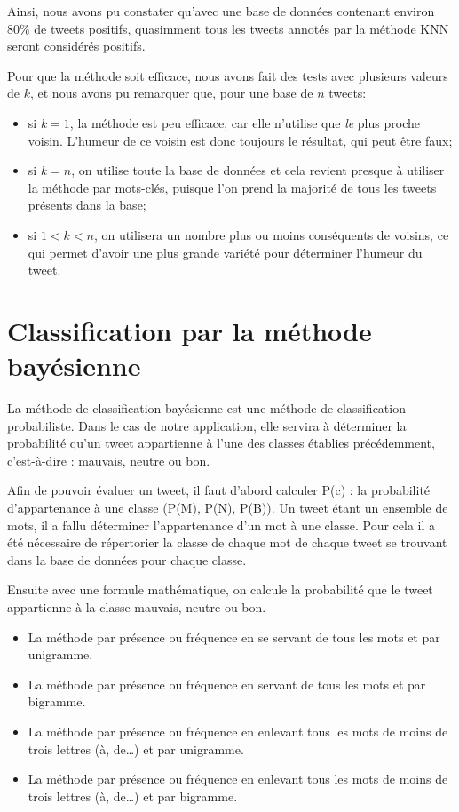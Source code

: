 \documentclass[12pt,a4paper]{report}
\begin{document}
Ainsi, nous avons pu constater qu'avec une base de données contenant environ
80\% de tweets positifs, quasimment tous les tweets annotés par la méthode KNN
seront considérés positifs.

Pour que la méthode soit efficace, nous avons fait des tests avec plusieurs
valeurs de $k$, et nous avons pu remarquer que, pour une base de $n$ tweets:

\begin{itemize}
	\item si $k=1$, la méthode est peu efficace, car elle n'utilise que
		\textit{le} plus proche voisin. L'humeur de ce voisin est donc
		toujours le résultat, qui peut être faux;
	\item si $k=n$, on utilise toute la base de données et cela revient presque
		à utiliser la méthode par mots-clés, puisque l'on prend la majorité de
		tous les tweets présents dans la base;
	\item si $1 < k < n$, on utilisera un nombre plus ou moins conséquents de
		voisins, ce qui permet d'avoir une plus grande variété pour déterminer
		l'humeur du tweet.
\end{itemize}

\section{Classification par la méthode bayésienne}
La méthode de classification bayésienne est une méthode de classification
probabiliste. Dans le cas de notre application, elle servira à déterminer la
probabilité qu'un tweet appartienne à l'une des classes établies précédemment,
c'est-à-dire : mauvais, neutre ou bon.

Afin de pouvoir évaluer un tweet, il faut d'abord calculer P(c) : la probabilité
d'appartenance à une classe (P(M), P(N), P(B)).
Un tweet étant un ensemble de mots, il a fallu déterminer l'appartenance d'un
mot à une classe. Pour cela il a été nécessaire de répertorier la classe de
chaque mot de chaque tweet se trouvant dans la base de données pour chaque
classe.

Ensuite avec une formule mathématique, on calcule la probabilité que le tweet
appartienne à la classe mauvais, neutre ou bon.

\begin{itemize}
	\item
		La méthode par présence ou fréquence en se servant de tous les mots et
		par unigramme.
	\item
		La méthode par présence ou fréquence en servant de tous les mots et par
		bigramme.
	\item
		La méthode par présence ou fréquence en enlevant tous les mots de moins
		de trois lettres (à, de…) et par unigramme.
	\item
		La méthode par présence ou fréquence en enlevant tous les mots de moins
		de trois lettres (à, de…) et par bigramme.
\end{itemize}
\end{document}
